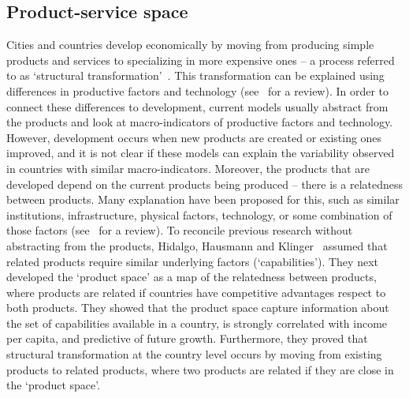\subsection{Product-service space}
\label{sec:pss}
Cities and countries develop economically by moving from producing simple products and services to specializing in more expensive ones -- a process referred to as `structural transformation'~\citep{smith1776, Romer1991,grossman1991,hidalgo2007}.
This transformation can be explained using differences in productive factors and technology (see~\citep{hausmann2011} for a review).
In order to connect these differences to development, 
current models usually abstract from the products and look at macro-indicators of productive factors and technology.
However, development occurs when new products are created or existing ones improved,
and it is not clear if these models can explain the variability observed in countries with similar macro-indicators.
Moreover, the products that are developed depend on the current products being produced -- there is a relatedness between products.
Many explanation have been proposed for this, 
such as similar institutions, infrastructure, physical factors, technology, or some combination of those factors (see~\cite{hidalgo2007} for a review).
To reconcile previous research without abstracting from the products,
Hidalgo, Hausmann and Klinger~\cite{hidalgo2007, hausmann2011, Hausmann2006,hidalgo2009} assumed that related products require similar underlying factors (`capabilities').
They next developed the `product space' as a map of the relatedness between products,
where products are related if countries have competitive advantages respect to both products.
They showed that the product space capture information about the set of capabilities available in a country, 
is strongly correlated with income per capita, 
and predictive of future growth.
Furthermore, they proved that structural transformation at the country level occurs by moving from existing products to related products, 
where two products are related if they are close in the `product space'.

